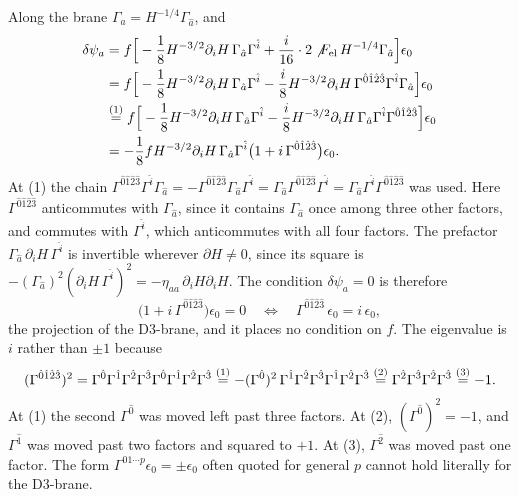 \begin{tcolorbox}[breakable]
\begin{remark}
Along the brane $\Gamma_a = H^{-1/4}\Gamma_{\hat a}$, and
\begin{align*}
\delta\psi_a &= f\Big[-\frac18H^{-3/2}\partial_iH\,\Gamma_{\hat a}\Gamma^{\hat i} + \frac{i}{16}\cdot2\not{F}_{\rm el}\,H^{-1/4}\Gamma_{\hat a}\Big]\epsilon_0 \\
&= f\Big[-\frac18H^{-3/2}\partial_iH\,\Gamma_{\hat a}\Gamma^{\hat i} - \frac{i}{8}H^{-3/2}\partial_iH\,\Gamma^{\hat0\hat1\hat2\hat3}\Gamma^{\hat i}\Gamma_{\hat a}\Big]\epsilon_0 \\
&\overset{(1)}{=} f\Big[-\frac18H^{-3/2}\partial_iH\,\Gamma_{\hat a}\Gamma^{\hat i} - \frac{i}{8}H^{-3/2}\partial_iH\,\Gamma_{\hat a}\Gamma^{\hat i}\Gamma^{\hat0\hat1\hat2\hat3}\Big]\epsilon_0 \\
&= -\frac18fH^{-3/2}\partial_iH\,\Gamma_{\hat a}\Gamma^{\hat i}\big(1+i\,\Gamma^{\hat0\hat1\hat2\hat3}\big)\epsilon_0 .
\end{align*}
At (1) the chain $\Gamma^{\hat0\hat1\hat2\hat3}\Gamma^{\hat i}\Gamma_{\hat a} = -\Gamma^{\hat0\hat1\hat2\hat3}\Gamma_{\hat a}\Gamma^{\hat i} = \Gamma_{\hat a}\Gamma^{\hat0\hat1\hat2\hat3}\Gamma^{\hat i} = \Gamma_{\hat a}\Gamma^{\hat i}\Gamma^{\hat0\hat1\hat2\hat3}$ was used. Here $\Gamma^{\hat0\hat1\hat2\hat3}$ anticommutes with $\Gamma_{\hat a}$, since it contains $\Gamma_{\hat a}$ once among three other factors, and commutes with $\Gamma^{\hat i}$, which anticommutes with all four factors. The prefactor $\Gamma_{\hat a}\,\partial_iH\,\Gamma^{\hat i}$ is invertible wherever $\partial H\ne0$, since its square is $-(\Gamma_{\hat a})^2(\partial_iH\,\Gamma^{\hat i})^2 = -\eta_{aa}\,\partial_iH\partial_iH$. The condition $\delta\psi_a=0$ is therefore
\begin{equation}
\big(1+i\,\Gamma^{\hat0\hat1\hat2\hat3}\big)\epsilon_0 = 0 \quad\Longleftrightarrow\quad \Gamma^{\hat0\hat1\hat2\hat3}\,\epsilon_0 = i\,\epsilon_0 ,
\tag{D.16}\label{d3proj}
\end{equation}
the projection of the D3-brane, and it places no condition on $f$. The eigenvalue is $i$ rather than $\pm1$ because
\begin{align*}
(\Gamma^{\hat0\hat1\hat2\hat3})^2 = \Gamma^{\hat0}\Gamma^{\hat1}\Gamma^{\hat2}\Gamma^{\hat3}\Gamma^{\hat0}\Gamma^{\hat1}\Gamma^{\hat2}\Gamma^{\hat3}
\overset{(1)}{=} -(\Gamma^{\hat0})^2\,\Gamma^{\hat1}\Gamma^{\hat2}\Gamma^{\hat3}\Gamma^{\hat1}\Gamma^{\hat2}\Gamma^{\hat3}
\overset{(2)}{=} \Gamma^{\hat2}\Gamma^{\hat3}\Gamma^{\hat2}\Gamma^{\hat3}
\overset{(3)}{=} -1 .
\end{align*}
At (1) the second $\Gamma^{\hat0}$ was moved left past three factors. At (2), $(\Gamma^{\hat0})^2 = -1$, and $\Gamma^{\hat1}$ was moved past two factors and squared to $+1$. At (3), $\Gamma^{\hat2}$ was moved past one factor. The form $\Gamma^{01\cdots p}\epsilon_0 = \pm\epsilon_0$ often quoted for general $p$ cannot hold literally for the D3-brane.


\end{remark}
\end{tcolorbox}
